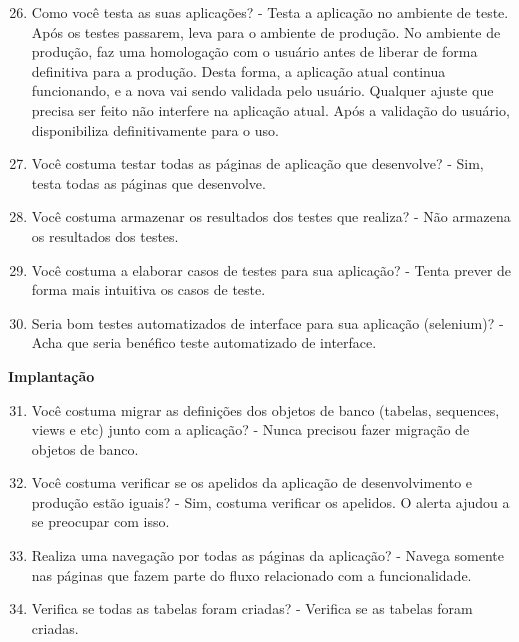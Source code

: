 \begin{apendicesenv}
\begin{enumerate}
	\setcounter{enumi}{25}
	\item Como você testa as suas aplicações?\newline
	- Testa a aplicação no ambiente de teste. Após os testes passarem, leva para o ambiente de produção. No ambiente de produção, faz uma homologação com o usuário antes de liberar de forma definitiva para a produção. Desta forma, a aplicação atual continua funcionando, e a nova vai sendo validada pelo usuário. Qualquer ajuste que precisa ser feito não interfere na aplicação atual. Após a validação do usuário, disponibiliza definitivamente para o uso.
	\item Você costuma testar todas as páginas de aplicação que desenvolve?\newline
	- Sim, testa todas as páginas que desenvolve.
	\item Você costuma armazenar os resultados dos testes que realiza?\newline
	- Não armazena os resultados dos testes.
	\item Você costuma a elaborar casos de testes para sua aplicação?\newline
	- Tenta prever de forma mais intuitiva os casos de teste.
	\item Seria bom testes automatizados de interface para sua aplicação (selenium)?\newline
	- Acha que seria benéfico teste automatizado de interface.
\end{enumerate}

\textbf{Implantação}

\begin{enumerate}
	\setcounter{enumi}{30}
	\item Você costuma migrar as definições dos objetos de banco (tabelas, sequences, views e
	etc) junto com a aplicação?\newline
	- Nunca precisou fazer migração de objetos de banco.
	\item Você costuma verificar se os apelidos da aplicação de desenvolvimento e produção
	estão iguais?\newline
	- Sim, costuma verificar os apelidos. O alerta ajudou a se preocupar com isso.
	\item Realiza uma navegação por todas as páginas da aplicação?\newline
	- Navega somente nas páginas que fazem parte do fluxo relacionado com a funcionalidade.
	\item Verifica se todas as tabelas foram criadas?\newline
	- Verifica se as tabelas foram criadas.
\end{enumerate}


\end{apendicesenv}
